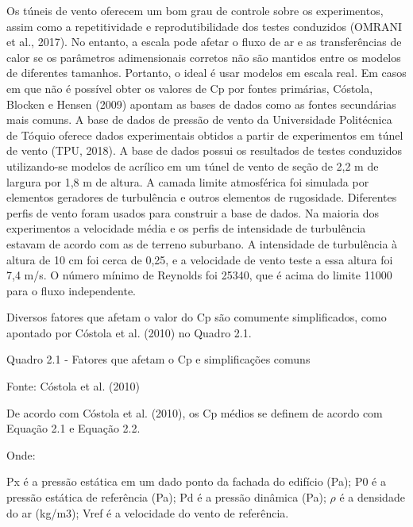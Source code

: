 \documentclass[brazil,hardcopy,openany,a5paper]{ufscthesis}
\begin{document}
	Os túneis de vento oferecem um bom grau de controle sobre os experimentos, assim como a repetitividade e reprodutibilidade dos testes conduzidos (OMRANI et al., 2017). No entanto, a escala pode afetar o fluxo de ar e as transferências de calor se os parâmetros adimensionais corretos não são mantidos entre os modelos de diferentes tamanhos. Portanto, o ideal é usar modelos em escala real.
	Em casos em que não é possível obter os valores de Cp por fontes primárias, Cóstola, Blocken e Hensen (2009) apontam as bases de dados como as fontes secundárias mais comuns. A base de dados de pressão de vento da Universidade Politécnica de Tóquio oferece dados experimentais obtidos a partir de experimentos em túnel de vento (TPU, 2018). A base de dados possui os resultados de testes conduzidos utilizando-se modelos de acrílico em um túnel de vento de seção de 2,2 m de largura por 1,8 m de altura. A camada limite
	atmosférica foi simulada por elementos geradores de turbulência e outros elementos de rugosidade. Diferentes perfis de vento foram usados para construir a base de dados. Na maioria dos experimentos a velocidade média e os perfis de intensidade de turbulência estavam de acordo com as de terreno suburbano. A intensidade de turbulência à altura de 10 cm foi cerca de 0,25, e a velocidade de vento teste a essa altura foi 7,4 m/s. O número mínimo de Reynolds foi 25340, que é acima do limite 11000 para o fluxo independente.
	
	Diversos fatores que afetam o valor do Cp são comumente simplificados, como apontado por Cóstola et al. (2010) no Quadro 2.1.
	
	Quadro 2.1 - Fatores que afetam o Cp e simplificações comuns
	
	Fonte: Cóstola et al. (2010)
	
	De acordo com Cóstola et al. (2010), os Cp médios se definem de acordo
	com Equação 2.1 e Equação 2.2.
	
	Onde:
	
	Px é a pressão estática em um dado ponto da fachada do edifício (Pa);
	P0 é a pressão estática de referência (Pa);
	Pd é a pressão dinâmica (Pa);
	$\rho$ é a densidade do ar (kg/m3);
	Vref é a velocidade do vento de referência.
	
\end{document}
